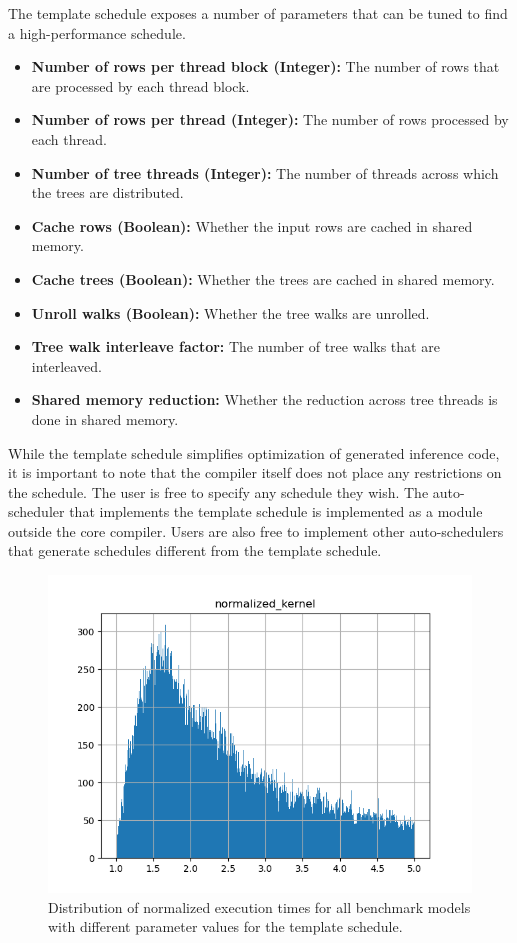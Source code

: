 The template schedule exposes a number of parameters that can be tuned to find a 
high-performance schedule.
\begin{itemize}
  \item \textbf{Number of rows per thread block (Integer):} The number of rows that are processed by each thread block.
  \item \textbf{Number of rows per thread (Integer):} The number of rows processed by each thread.
  \item \textbf{Number of tree threads (Integer):} The number of threads across which the trees are distributed.
  \item \textbf{Cache rows (Boolean):} Whether the input rows are cached in shared memory.
  \item \textbf{Cache trees (Boolean):} Whether the trees are cached in shared memory.
  \item \textbf{Unroll walks (Boolean):} Whether the tree walks are unrolled.
  \item \textbf{Tree walk interleave factor:} The number of tree walks that are interleaved.
  \item \textbf{Shared memory reduction:} Whether the reduction across tree threads is done in shared memory.
\end{itemize}

While the template schedule simplifies optimization of generated inference code, it is 
important to note that the \Treebeard{} compiler itself does not place any 
restrictions on the schedule. The user is free to specify any schedule they wish.
The auto-scheduler that implements the template schedule is implemented as a 
module outside the core \Treebeard{} compiler. Users are also free to implement 
other auto-schedulers that generate schedules different from the template schedule.

\begin{figure}[htb]
  \centering
  \includegraphics[width=\linewidth]{figures/normalized_kernel_histogram_lt5.png}
  \caption{Distribution of normalized execution times for all benchmark models
  with different parameter values for the template schedule. }
  \label{Fig:ExecTimeDistribution}
\end{figure}

